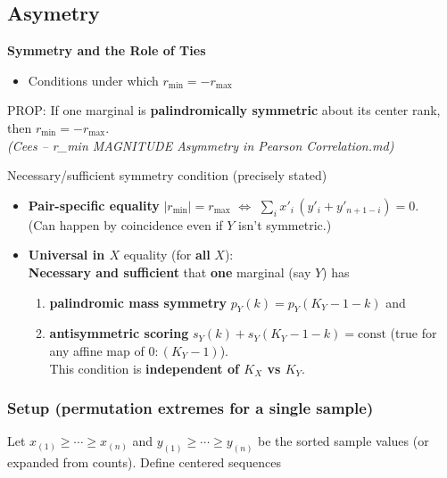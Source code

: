 \documentclass[
  12pt,
]{article}
\providecommand{\tightlist}{%
  \setlength{\itemsep}{0pt}\setlength{\parskip}{0pt}}
\theoremstyle{plain}
\theoremstyle{definition}
\theoremstyle{remark}
\begin{document}
\subsection{Asymetry}\label{asymetry}

\textbf{Symmetry and the Role of Ties}

\begin{itemize}
\tightlist
\item
  Conditions under which \(r_{\min} = -r_{\max}\)
\end{itemize}

PROP: If one marginal is \textbf{palindromically symmetric} about its
center rank, then \(r_{\min} = -r_{\max}\).\\
\emph{(Cees -- r\_min MAGNITUDE Asymmetry in Pearson Correlation.md)}

Necessary/sufficient symmetry condition (precisely stated)

\begin{itemize}
\tightlist
\item
  \textbf{Pair-specific equality} \(|r_{\min}|=r_{\max}\) \(\iff\)
  \(\sum_i x'_i\,(y'_i+y'_{n+1-i})=0\).\\
  (Can happen by coincidence even if \(Y\) isn't symmetric.)
\item
  \textbf{Universal in \(X\)} equality (for \textbf{all} \(X\)):\\
  \textbf{Necessary and sufficient} that \textbf{one} marginal (say
  \(Y\)) has

  \begin{enumerate}
  \def\labelenumi{(\roman{enumi})}
  \tightlist
  \item
    \textbf{palindromic mass symmetry} \(p_Y(k)=p_Y(K_Y-1-k)\) and\\
  \item
    \textbf{antisymmetric scoring} \(s_Y(k)+s_Y(K_Y-1-k)=\text{const}\)
    (true for any affine map of \(0{:}(K_Y-1)\)).\\
    This condition is \textbf{independent of \(K_X\) vs \(K_Y\)}.
  \end{enumerate}
\end{itemize}

\subsubsection{Setup (permutation extremes for a single
sample)}\label{setup-permutation-extremes-for-a-single-sample}

Let \(x_{(1)}\ge\cdots\ge x_{(n)}\) and \(y_{(1)}\ge\cdots\ge y_{(n)}\)
be the sorted sample values (or expanded from counts). Define centered
sequences
\end{document}
